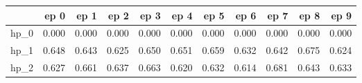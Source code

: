 \begin{tabular}{lrrrrrrrrrr}
\toprule
{} &   ep 0 &   ep 1 &   ep 2 &   ep 3 &   ep 4 &   ep 5 &   ep 6 &   ep 7 &   ep 8 &   ep 9 \\
\midrule
hp\_0 &  0.000 &  0.000 &  0.000 &  0.000 &  0.000 &  0.000 &  0.000 &  0.000 &  0.000 &  0.000 \\
hp\_1 &  0.648 &  0.643 &  0.625 &  0.650 &  0.651 &  0.659 &  0.632 &  0.642 &  0.675 &  0.624 \\
hp\_2 &  0.627 &  0.661 &  0.637 &  0.663 &  0.620 &  0.632 &  0.614 &  0.681 &  0.643 &  0.633 \\
\bottomrule
\end{tabular}
